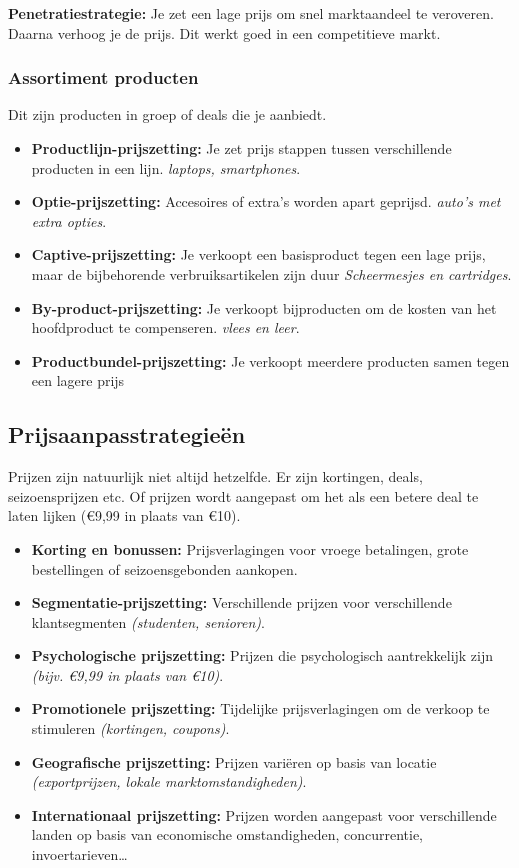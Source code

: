 \documentclass[a4paper,11pt]{article}
\begin{document}
\textbf{Penetratiestrategie:} Je zet een lage prijs om snel marktaandeel te veroveren.
Daarna verhoog je de prijs.
Dit werkt goed in een competitieve markt. 


\subsubsection{Assortiment producten}
Dit zijn producten in groep of deals die je aanbiedt.

\begin{itemize}
    \item \textbf{Productlijn-prijszetting:} Je zet prijs stappen tussen verschillende producten in een lijn. \textit{laptops, smartphones}.
    \item \textbf{Optie-prijszetting:} Accesoires of extra's worden apart geprijsd. \textit{auto's met extra opties}.
    \item \textbf{Captive-prijszetting:} Je verkoopt een basisproduct tegen een lage prijs, maar de bijbehorende 
    verbruiksartikelen zijn duur \textit{Scheermesjes en cartridges}.
    \item \textbf{By-product-prijszetting:} Je verkoopt bijproducten
     om de kosten van het hoofdproduct te compenseren. \textit{vlees en leer}.
     \item \textbf{Productbundel-prijszetting:} Je verkoopt meerdere producten
      samen tegen een lagere prijs
\end{itemize}


\subsection{Prijsaanpasstrategieën}
Prijzen zijn natuurlijk niet altijd hetzelfde. Er zijn kortingen, deals, seizoensprijzen etc.
Of prijzen wordt aangepast om het als een betere deal te laten lijken (€9,99 in plaats van €10).
\begin{itemize}
    \item \textbf{Korting en bonussen:} Prijsverlagingen voor vroege betalingen, grote bestellingen of seizoensgebonden aankopen.
    \item \textbf{Segmentatie-prijszetting:} Verschillende prijzen voor verschillende klantsegmenten \textit{(studenten, senioren)}.
    \item \textbf{Psychologische prijszetting:} Prijzen die psychologisch aantrekkelijk zijn \textit{(bijv. €9,99 in plaats van €10)}.
    \item \textbf{Promotionele prijszetting:} Tijdelijke prijsverlagingen om de verkoop te stimuleren \textit{(kortingen, coupons)}.
    \item \textbf{Geografische prijszetting:} Prijzen variëren op basis van locatie \textit{(exportprijzen, lokale marktomstandigheden)}.
    \item \textbf{Internationaal prijszetting:} Prijzen worden aangepast voor verschillende landen op basis van economische omstandigheden, concurrentie,
    invoertarieven\dots
\end{itemize}
\end{document}
